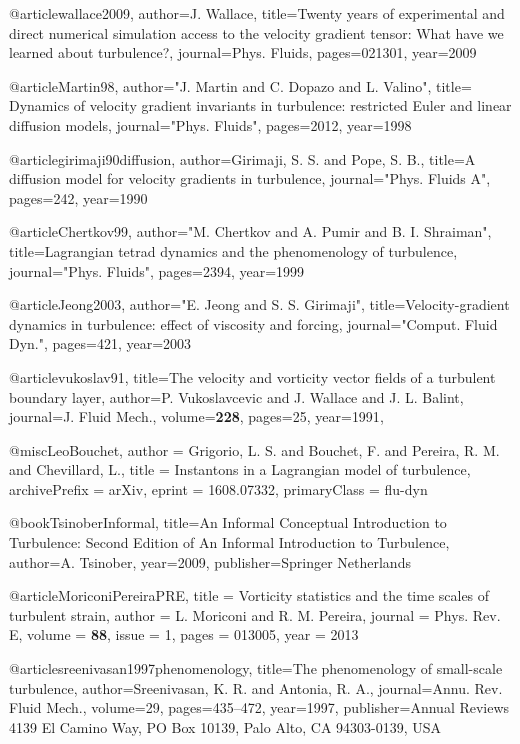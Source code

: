   @article{wallace2009,
    author={J. Wallace},
    title={{Twenty years of experimental and direct numerical simulation access to the velocity gradient tensor: What have we learned about turbulence?}},
    journal={Phys. Fluids},
    pages={021301},
    year={2009}
  }

  @article{Martin98,
  author="J. Martin and C. Dopazo and L. Valino",
  title={{ Dynamics of velocity gradient invariants in turbulence: restricted Euler and linear diffusion models}},
  journal="Phys. Fluids",
  pages=2012,
  year=1998
  }

  @article{girimaji90diffusion,
  author={Girimaji, S. S. and Pope, S. B.},
  title={{A diffusion model for velocity gradients in turbulence}},
  journal="Phys. Fluids A",
  pages=242,
  year=1990
  }

  @article{Chertkov99,
  author="M. Chertkov and A. Pumir and B. I. Shraiman",
  title={{Lagrangian tetrad dynamics and the phenomenology of turbulence}},
  journal="Phys. Fluids",
  pages=2394,
  year=1999
  }

  @article{Jeong2003,
  author="E. Jeong and S. S. Girimaji",
  title={{Velocity-gradient dynamics in turbulence: effect of viscosity and forcing}},
  journal="Comput. Fluid Dyn.",
  pages=421,
  year=2003
  }

  @article{vukoslav91,
    title={{The velocity and vorticity vector fields of a turbulent boundary layer}},
    author={P. Vukoslavcevic and J. Wallace and J. L. Balint},
    journal={J. Fluid Mech.},
    volume={\textbf{228}},
    pages={25},
    year={1991},
  }

  @misc{LeoBouchet,
   author    = {Grigorio, L. S. and Bouchet, F. and Pereira, R. M. and Chevillard, L.},
   title     = {Instantons in a Lagrangian model of turbulence},
   archivePrefix = {arXiv},
   eprint        = {1608.07332},
   primaryClass  = {flu-dyn}
  }

  @book{TsinoberInformal,
    title={{An Informal Conceptual Introduction to Turbulence: Second Edition of An Informal Introduction to Turbulence}},
    author={A. Tsinober},
    year={2009},
    publisher={Springer Netherlands}
  }

  @article{MoriconiPereiraPRE,
    title = {Vorticity statistics and the time scales of turbulent strain},
    author = {L. Moriconi  and R. M. Pereira},
    journal = {Phys. Rev. E},
    volume = {\textbf{88}},
    issue = {1},
    pages = {013005},
    year = {2013}
    }

  @article{sreenivasan1997phenomenology,
    title={{The phenomenology of small-scale turbulence}},
    author={Sreenivasan, K. R. and Antonia, R. A.},
    journal={Annu. Rev. Fluid Mech.},
    volume={29},
    pages={435--472},
    year={1997},
    publisher={Annual Reviews 4139 El Camino Way, PO Box 10139, Palo Alto, CA 94303-0139, USA}
  }

